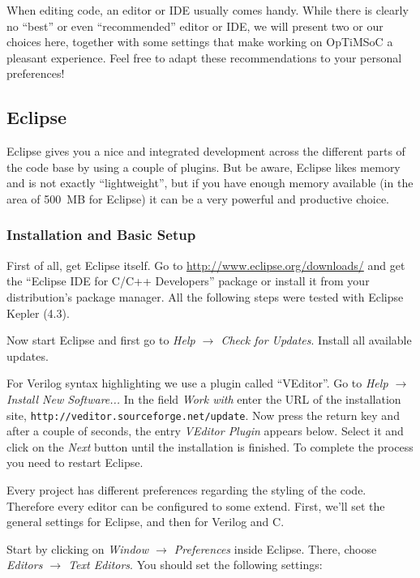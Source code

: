 When editing code, an editor or IDE usually comes handy. While there is clearly
no ``best'' or even ``recommended'' editor or IDE, we will present two or our
choices here, together with some settings that make working on OpTiMSoC a
pleasant experience. Feel free to adapt these recommendations to your personal
preferences!

\subsection{Eclipse}

Eclipse gives you a nice and integrated development across the different parts
of the code base by using a couple of plugins. But be aware, Eclipse likes
memory and is not exactly ``lightweight'', but if you have enough memory
available (in the area of 500~MB for Eclipse) it can be a very powerful and
productive choice.

\subsubsection{Installation and Basic Setup}

First of all, get Eclipse itself. Go to \url{http://www.eclipse.org/downloads/}
and get the ``Eclipse IDE for C/C++ Developers'' package or install it from
your distribution's package manager. All the following steps were tested with
Eclipse Kepler (4.3).

Now start Eclipse and first go to \emph{Help $\rightarrow$ Check for Updates}.
Install all available updates.

For Verilog syntax highlighting we use a plugin called ``VEditor''. Go to
\emph{Help $\rightarrow$ Install New Software...} In the field \emph{Work with}
enter the URL of the installation site,
\verb|http://veditor.sourceforge.net/update|. Now press the return key and after
a couple of seconds, the entry \emph{VEditor Plugin} appears below. Select it
and click on the \emph{Next} button until the installation is finished. To
complete the process you need to restart Eclipse.

Every project has different preferences regarding the styling of the code.
Therefore every editor can be configured to some extend. First, we'll set the
general settings for Eclipse, and then for Verilog and C.

Start by clicking on \emph{Window $\rightarrow$ Preferences} inside Eclipse.
There, choose \emph{Editors $\rightarrow$ Text Editors}. You should set the
following settings:

